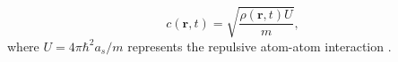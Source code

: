 \begin{equation}
c(\textbf{r},t) = \sqrt{\frac{\rho (\textbf{r},t) U}{m}},
\end{equation}
where $U=4\pi\hbar^2 a_s/m$ represents the repulsive atom-atom interaction \cite{BEC:Andrews_prl_1997}. %

